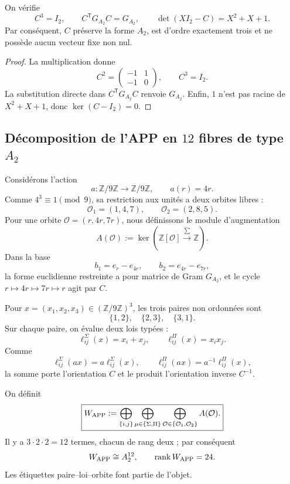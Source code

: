\begin{proposition}
\label{p12-83-c1-s5:prop:coxeter-a2-autonomo}
On vérifie
\[
 C^3=I_2,
 \qquad
 C^{\mathsf T}G_{A_2}C=G_{A_2},
 \qquad
 \det(XI_2-C)=X^2+X+1.
\]
Par conséquent, \(C\) préserve la forme \(A_2\), est d’ordre exactement trois et
ne possède aucun vecteur fixe non nul.
\end{proposition}

\begin{proof}
La multiplication donne
\[
 C^2=\begin{pmatrix}-1&1\\-1&0\end{pmatrix},
 \qquad C^3=I_2.
\]
La substitution directe dans \(C^{\mathsf T}G_{A_2}C\) renvoie
\(G_{A_2}\). Enfin, \(1\) n’est pas racine de \(X^2+X+1\), donc
\(\ker(C-I_2)=0\).
\end{proof}

\subsection{Décomposition de l’APP en \(12\) fibres de type \(A_2\)}

Considérons l’action
\[
 a:\mathbb Z/9\mathbb Z\longrightarrow\mathbb Z/9\mathbb Z,
 \qquad a(r)=4r.
\]
Comme \(4^3\equiv1\pmod9\), sa restriction aux unités a deux orbites
libres :
\[
 \mathcal O_1=(1,4,7),
 \qquad
 \mathcal O_2=(2,8,5).
\]
Pour une orbite \(\mathcal O=(r,4r,7r)\), nous définissons le module d’augmentation
\[
 A(\mathcal O):=
 \ker\!\left(\mathbb Z[\mathcal O]
 \xrightarrow{\,\sum\,}\mathbb Z\right).
\]
Dans la base
\[
 b_1=e_r-e_{4r},
 \qquad b_2=e_{4r}-e_{7r},
\]
la forme euclidienne restreinte a pour matrice de Gram \(G_{A_2}\), et le cycle
\(r\mapsto4r\mapsto7r\mapsto r\) agit par \(C\).

Pour \(x=(x_1,x_2,x_3)\in(\mathbb Z/9\mathbb Z)^3\), les trois paires non
ordonnées sont
\[
 \{1,2\},\quad\{2,3\},\quad\{3,1\}.
\]
Sur chaque paire, on évalue deux lois typées :
\[
 \ell_{ij}^{\Sigma}(x)=x_i+x_j,
 \qquad
 \ell_{ij}^{\Pi}(x)=x_ix_j.
\]
Comme
\[
 \ell_{ij}^{\Sigma}(ax)=a\ell_{ij}^{\Sigma}(x),
 \qquad
 \ell_{ij}^{\Pi}(ax)=a^{-1}\ell_{ij}^{\Pi}(x),
\]
la somme porte l’orientation \(C\) et le produit l’orientation inverse
\(C^{-1}\).

\begin{definition}
\label{p12-83-c1-s5:def:modulo-ciclotomico-app-autonomo}
On définit
\[
 \boxed{
 W_{\rm APP}:=
 \bigoplus_{\{i,j\}}
 \bigoplus_{\mu\in\{\Sigma,\Pi\}}
 \bigoplus_{\mathcal O\in\{\mathcal O_1,\mathcal O_2\}}
 A(\mathcal O).}
\]
Il y a \(3\cdot2\cdot2=12\) termes, chacun de rang deux ; par conséquent
\[
 W_{\rm APP}\cong A_2^{12},
 \qquad \operatorname{rank}W_{\rm APP}=24.
\]
Les étiquettes paire--loi--orbite font partie de l’objet.
\end{definition}

